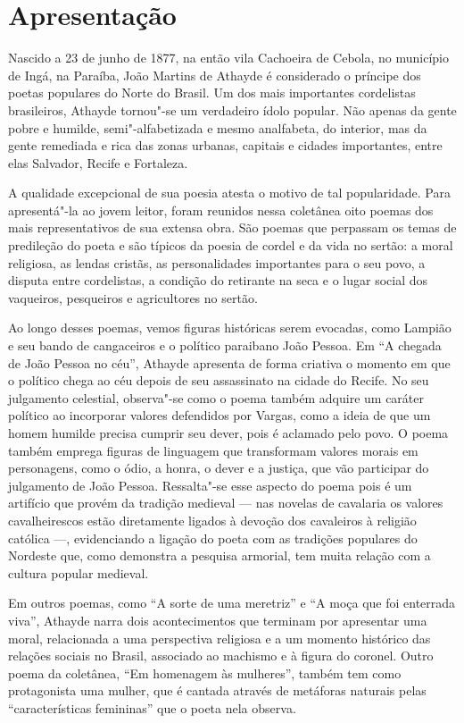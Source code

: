 \chapter{Apresentação}

Nascido a 23 de junho de 1877, na então vila Cachoeira de Cebola, no município de Ingá, na Paraíba, João Martins de Athayde é considerado o príncipe dos poetas populares do Norte do Brasil. Um dos mais importantes cordelistas brasileiros, Athayde tornou"-se um verdadeiro ídolo popular. Não apenas da gente pobre e humilde, semi"-alfabetizada e mesmo analfabeta, do interior, mas da gente remediada e rica das zonas urbanas, capitais e cidades importantes, entre elas Salvador, Recife e Fortaleza.

A qualidade excepcional de sua poesia atesta o motivo de tal popularidade.
Para apresentá"-la ao jovem leitor, foram reunidos nessa coletânea oito poemas dos mais representativos de sua extensa obra. São poemas que perpassam os temas de predileção do poeta e são típicos da poesia de cordel e da vida no sertão: a moral religiosa, as lendas cristãs, as personalidades importantes para o seu povo, a disputa entre cordelistas, a condição do retirante na seca e o lugar social dos vaqueiros, pesqueiros e agricultores no sertão.

Ao longo desses poemas, vemos figuras históricas serem evocadas, como Lampião e seu bando de cangaceiros e o político paraibano João Pessoa.
Em ``A chegada de João Pessoa no céu'', Athayde apresenta de forma criativa o momento em que o político chega ao céu depois de seu assassinato na cidade do
Recife. No seu julgamento celestial, observa"-se como o poema também adquire um caráter político ao incorporar valores defendidos por Vargas, como a ideia de que um homem humilde precisa cumprir seu dever, pois é aclamado pelo povo. 
O poema também emprega figuras de linguagem que transformam valores morais em personagens, como o ódio, a honra, o dever e a justiça, que vão participar do julgamento de João Pessoa.
Ressalta"-se esse aspecto do poema pois é um
artifício que provém da tradição medieval --- nas novelas de
cavalaria os valores cavalheirescos estão diretamente ligados à
devoção dos cavaleiros à religião católica ---, evidenciando a ligação do poeta com as tradições populares do Nordeste que, como demonstra a pesquisa armorial, tem muita relação com a cultura popular medieval.

Em outros poemas, como ``A sorte de uma meretriz'' e ``A moça que foi
enterrada viva'', Athayde narra dois acontecimentos
que terminam por apresentar uma moral, relacionada a
uma perspectiva religiosa e a um momento histórico das relações
sociais no Brasil, associado ao machismo e à figura do coronel.
Outro poema da coletânea, ``Em homenagem às
mulheres'', também tem como protagonista uma mulher, que é cantada através de metáforas naturais pelas ``características femininas'' que o poeta nela observa.

